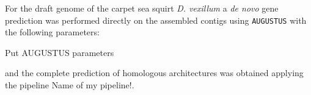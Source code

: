 \documentclass[11pt]{article}
\newcommand{\TODO}[1]{\begingroup\color{red}#1\endgroup}
\begin{document}
For the draft genome of the carpet sea squirt \textit{D. vexillum} 
\cite{velandia2016a} a \textit{de novo} gene prediction was performed 
directly on the assembled contigs using \texttt{AUGUSTUS} \cite{augustus} 
with the following parameters:

\TODO{Put AUGUSTUS parameters}

and the complete prediction of homologous architectures was obtained applying 
the pipeline \TODO{Name of my pipeline!}.



\end{document}
